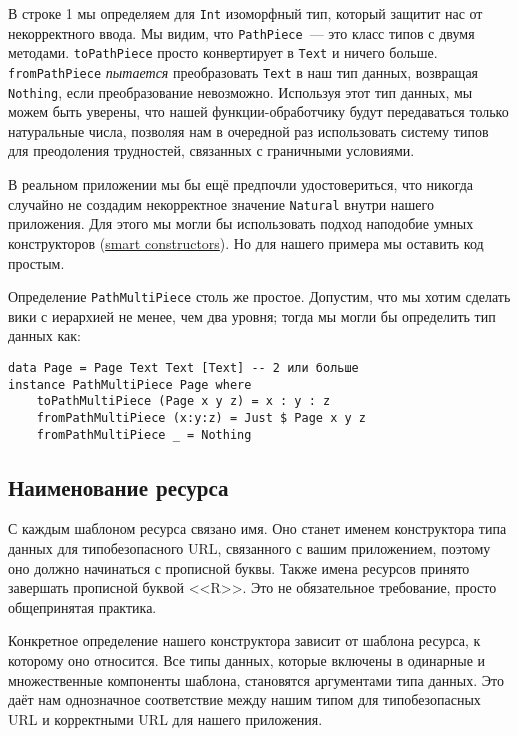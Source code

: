 В строке 1 мы определяем для \lstinline!Int! изоморфный тип, который защитит нас от
некорректного ввода. Мы видим, что \lstinline!PathPiece!~--- это класс типов с двумя
методами. \lstinline!toPathPiece! просто конвертирует в \lstinline!Text! и ничего
больше. \lstinline!fromPathPiece!  \emph{пытается} преобразовать \lstinline!Text! в наш
тип данных, возвращая \lstinline!Nothing!, если преобразование невозможно. Используя этот
тип данных, мы можем быть уверены, что нашей функции-обработчику будут передаваться только
натуральные числа, позволяя нам в очередной раз использовать систему типов для преодоления
трудностей, связанных с граничными условиями.

\begin{remark}
  В реальном приложении мы бы ещё предпочли удостовериться, что никогда случайно не
  создадим некорректное значение \lstinline!Natural! внутри нашего приложения. Для этого
  мы могли бы использовать подход наподобие умных конструкторов
  (\href{http://www.haskell.org/haskellwiki/Smart\_constructors}{smart
    constructors}\footnotemark).  Но для нашего примера мы оставить код простым.
\end{remark}


Определение \lstinline!PathMultiPiece! столь же простое. Допустим, что мы хотим сделать
вики с иерархией не менее, чем два уровня; тогда мы могли бы определить тип данных как:
\begin{lstlisting}
data Page = Page Text Text [Text] -- 2 или больше
instance PathMultiPiece Page where
    toPathMultiPiece (Page x y z) = x : y : z
    fromPathMultiPiece (x:y:z) = Just $ Page x y z
    fromPathMultiPiece _ = Nothing
\end{lstlisting}%

\subsection{Наименование ресурса}
С каждым шаблоном ресурса связано имя. Оно станет именем конструктора типа данных для
типобезопасного URL, связанного с вашим приложением, поэтому оно должно начинаться с
прописной буквы. Также имена ресурсов принято завершать прописной буквой <<R>>. Это не
обязательное требование, просто общепринятая практика.

Конкретное определение нашего конструктора зависит от шаблона ресурса, к которому оно
относится. Все типы данных, которые включены в одинарные и множественные компоненты
шаблона, становятся аргументами типа данных. Это даёт нам однозначное соответствие между
нашим типом для типобезопасных URL и корректными URL для нашего приложения.

